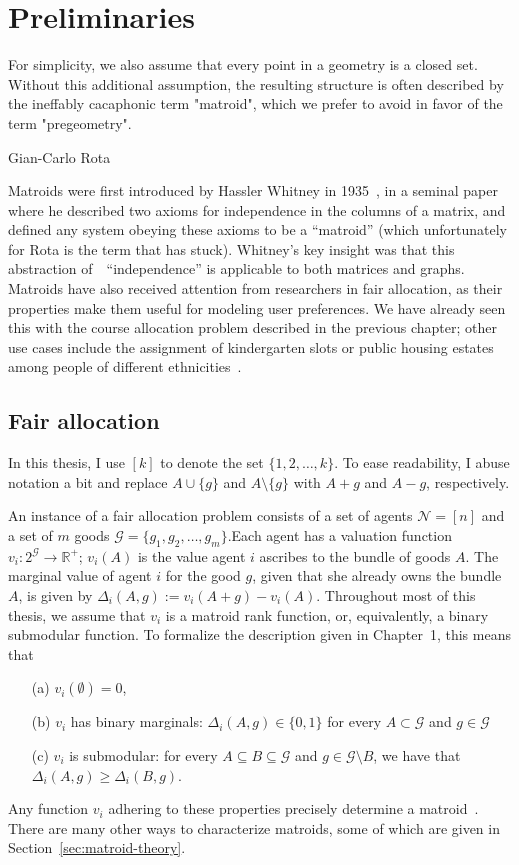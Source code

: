 \chapter{Preliminaries}
\label{chap:prelims}
\epigraph{For simplicity, we also assume that every point in a geometry is a closed set. Without this additional assumption, the resulting structure is often described by the ineffably cacaphonic term "matroid", which we prefer to avoid in favor of the term "pregeometry".}{Gian-Carlo Rota \cite{crapo_rota_1970}}

Matroids were first introduced by Hassler Whitney in 1935~\cite{whitney-1935}, in a seminal paper where he described two axioms for independence in the columns of a matrix, and defined any system obeying these axioms to be a ``matroid'' (which unfortunately for Rota is the term that has stuck). Whitney's key insight was that this abstraction of~~``independence'' is applicable to both matrices and graphs. Matroids have also received attention from researchers in fair allocation, as their properties make them useful for modeling user preferences. We have already seen this with the course allocation problem described in the previous chapter; other use cases include the assignment of kindergarten slots or public housing estates among people of different ethnicities~\cite{benabbou-2021}.

\section{Fair allocation}
In this thesis, I use $[k]$ to denote the set $\{1,2,\dots,k\}$. To ease readability, I abuse notation a bit and replace $A \cup \{g\}$ and $A \setminus \{g\}$ with $A+g$ and $A-g$, respectively.

An instance of a fair allocation problem consists of a set of agents $\mathcal{N} = [n]$ and a set of $m$ goods $\mathcal{G} = \{g_1, g_2, \dots, g_m\}$.Each agent has a valuation function $v_i: 2^\mathcal{G} \to \mathbb{R}^+$; $v_i(A)$ is the value agent $i$ ascribes to the bundle of goods $A$. The marginal value of agent $i$ for the good $g$, given that she already owns the bundle $A$, is given by $\Delta_i(A, g) := v_i(A + g) - v_i(A)$. Throughout most of this thesis, we assume that $v_i$ is a matroid rank function, or, equivalently, a binary submodular function. To formalize the description given in Chapter~1, this means that
\begin{enumerate}
  \item[(a)] $v_i(\emptyset) = 0$,
  \item[(b)] $v_i$ has binary marginals: $\Delta_i(A, g)\in \{0,1\}$ for every $A \subset \mathcal{G}$ and $g\in \mathcal{G}$
  \item[(c)] $v_i$ is submodular: for every $A\subseteq B\subseteq \mathcal{G}$ and $g\in \mathcal{G}\setminus B$, we have that $\Delta_i(A, g) \geq \Delta_i(B, g)$.
\end{enumerate}
Any function $v_i$ adhering to these properties precisely determine a matroid~\cite{schrijver-2003}. There are many other ways to characterize matroids, some of which are given in Section~\ref{sec:matroid-theory}.


